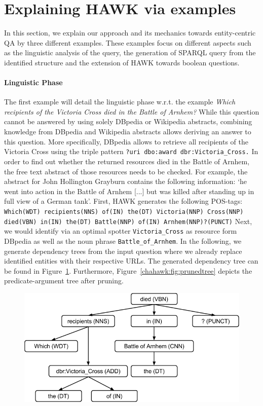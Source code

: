 \section{Explaining HAWK via examples}
\label{sec:hawkexample}
In this section, we explain our approach and its mechanics towards entity-centric \ac{QA} by three different examples. 
These examples focus on different aspects such as the linguistic analysis of the query, the generation of SPARQL query from the identified structure and the extension of HAWK towards boolean questions.
\paragraph{Linguistic Phase} The first example will detail the linguistic phase w.r.t. the  example \emph{Which recipients of the Victoria Cross died in the Battle of Arnhem?}
While this question cannot be answered by using solely DBpedia or Wikipedia abstracts, combining knowledge from DBpedia and Wikipedia abstracts allows deriving an answer to this question.
 More specifically, DBpedia allows to retrieve all recipients of the Victoria Cross using the triple pattern \texttt{?uri dbo:award dbr:Victoria\_Cross.}
In order to find out whether the returned resources died in the Battle of Arnhem, the free text abstract of those resources needs to be checked. 
For example, the abstract for John Hollington Grayburn contains the following information: 
`he went into action in the Battle of Arnhem [...] but was killed after standing up in full view of a German tank'. 
First, HAWK generates the following POS-tags:
\texttt{Which(WDT) recipients(NNS) of(IN) the(DT) Victoria(NNP) Cross(NNP) died(VBN) in(IN) the(DT) Battle(NNP) of(IN) Arnhem(NNP)?(PUNCT)}
Next, we would identify via an optimal spotter \texttt{Victoria\_Cross} as resource form DBpedia as well as the noun phrase \texttt{Battle\_of\_Arnhem}.
In the following, we generate dependency trees from the input question where we already replace identified entities with their respective URLs.
The generated dependency tree can be found in Figure~\ref{chahawk:fig:dependency_tree}.
Furthermore, Figure~\ref{chahawk:fig:prunedtree} depicts the predicate-argument tree after pruning.
\begin{figure}[htb!]
\centering
\includegraphics[scale=0.4]{part_03/ESWC_HAWK/hawk_tree_full}
\label{chahawk:fig:dependency_tree}
\end{figure}


